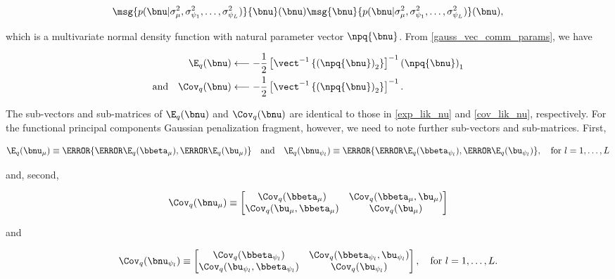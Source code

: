 \documentclass[12pt]{article}
\theoremstyle{plain}
\theoremstyle{definition}
\theoremstyle{remark}
\def\sigsqmu{\sigma^2_{\mu}}
\def\betamu{\bbeta_\mu}
\def\umu{\bu_\mu}
\def\numu{\bnu_\mu}
\newcommand\betapsi[1]{\bbeta_{\psi_{#1}}}
\newcommand\upsi[1]{\bu_{\psi_{#1}}}
\newcommand\nupsi[1]{\bnu_{\psi_{#1}}}
\newcommand\sigsqpsi[1]{\sigma^2_{\psi_{#1}}}
\begin{document}
\[
	\msg{p(\bnu | \sigsqmu, \sigsqpsi{1}, \dots, \sigsqpsi{L})}{\bnu} (\bnu)
	\msg{\bnu}{p(\bnu | \sigsqmu, \sigsqpsi{1}, \dots, \sigsqpsi{L})} (\bnu),
\]

\noindent which is a multivariate normal density function with natural parameter vector $\npq{\bnu}$.
From \eqref{gauss_vec_comm_params}, we have

\begin{align}
\begin{split}
	\E_q (\bnu)
		&\longleftarrow
			-\frac12 \left[
				\vect^{-1} \left\{
					\left( \npq{\bnu} \right)_2
				\right\}
			\right]^{-1} \left( \npq{\bnu} \right)_1 \\
	\text{and} \quad
	\Cov_q (\bnu)
		&\longleftarrow
			-\frac12 \left[
				\vect^{-1} \left\{
					\left( \npq{\bnu} \right)_2
				\right\}
			\right]^{-1}.
\end{split}
\label{mom_pen_nu}
\end{align}

\noindent The sub-vectors and sub-matrices of $\E_q (\bnu)$ and $\Cov_q (\bnu)$ are identical to those in
\eqref{exp_lik_nu} and \eqref{cov_lik_nu}, respectively. For the functional principal components Gaussian penalization fragment,
however, we need to note further sub-vectors and sub-matrices. First,

\begin{equation}
	\E_q (\numu) \equiv \T{\left\{ \T{\E_q (\betamu)}, \T{\E_q (\umu)} \right\}} \quad
	\text{and} \quad
	\E_q (\nupsi{l}) \equiv \T{\left\{ \T{\E_q (\betapsi{l})}, \T{\E_q (\upsi{l})} \right\}}, \quad
	\text{for $l = 1, \dots, L$}
\label{exp_betau}
\end{equation}

\noindent and, second,

\begin{equation}
	\Cov_q (\numu) \equiv \begin{bmatrix}
		\Cov_q (\betamu) & \Cov_q (\betamu, \umu) \\
		\Cov_q (\umu, \betamu) & \Cov_q (\umu)
	\end{bmatrix}
\label{cov_betau_mu}
\end{equation}

\noindent and

\begin{equation}
	\Cov_q (\nupsi{l}) \equiv \begin{bmatrix}
		\Cov_q (\betapsi{l}) & \Cov_q (\betapsi{l}, \upsi{l}) \\
		\Cov_q (\upsi{l}, \betapsi{l}) & \Cov_q (\upsi{l})
	\end{bmatrix}, \quad
	\text{for $l = 1, \dots, L$.}
\label{cov_betau_psi}
\end{equation}
\end{document}
